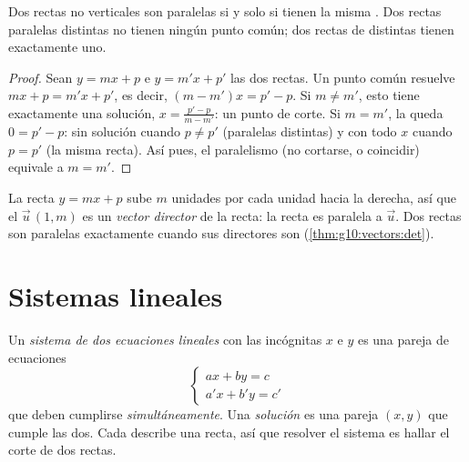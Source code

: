 \begin{proposition}\label{prop:g10:lines:parallel}
Dos rectas no verticales son paralelas si y solo si tienen la misma
. Dos rectas paralelas distintas no tienen ningún punto común;
dos rectas de  distintas tienen exactamente uno.
\end{proposition}

\begin{proof}
Sean $y = mx + p$ e $y = m'x + p'$ las dos rectas. Un punto común resuelve
$mx + p = m'x + p'$, es decir, $(m - m')x = p' - p$. Si $m \neq m'$, esto
tiene exactamente una solución, $x = \frac{p' - p}{m - m'}$: un punto de
corte. Si $m = m'$, la  queda $0 = p' - p$: sin solución cuando
$p \neq p'$ (paralelas distintas) y con todo $x$ cuando $p = p'$ (la misma
recta). Así pues, el paralelismo (no cortarse, o coincidir) equivale a
$m = m'$.
\end{proof}

\begin{remark}
La recta $y = mx + p$ sube $m$ unidades por cada unidad hacia la derecha,
así que el  $\vec u\,(1, m)$ es un \emph{vector
director} de la recta: la recta es paralela a
$\vec u$. Dos rectas son paralelas exactamente cuando sus 
directores son  (\cref{thm:g10:vectors:det}).
\end{remark}

\section{Sistemas lineales}

\begin{definition}\label{def:g10:lines:system}
Un \emph{sistema de dos ecuaciones lineales} con las
incógnitas $x$ e $y$ es una pareja de ecuaciones
\[
\begin{cases}
a x + b y = c \\
a' x + b' y = c'
\end{cases}
\]
que deben cumplirse \emph{simultáneamente}. Una \emph{solución} es una
pareja $(x, y)$ que cumple las dos. Cada  describe una recta, así
que resolver el sistema es hallar el corte de dos rectas.
\end{definition}

